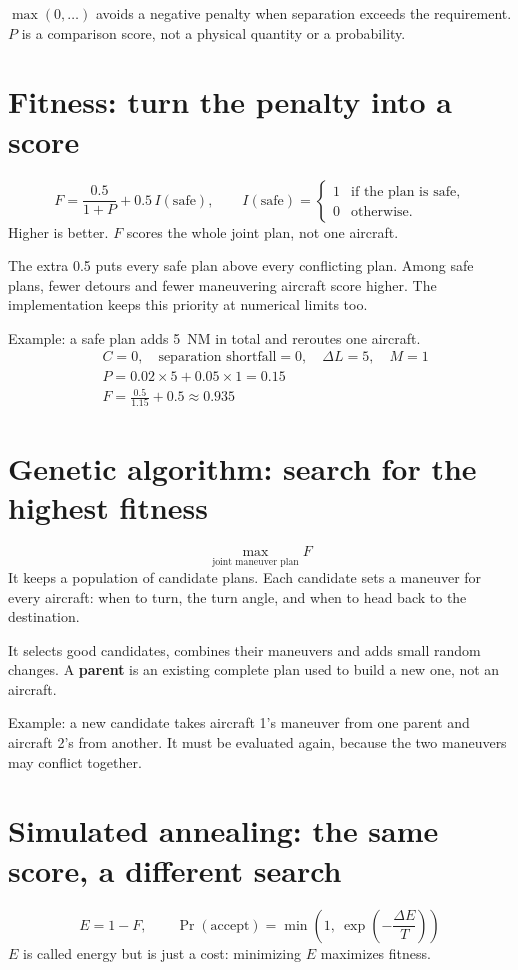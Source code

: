 \documentclass[10pt,a4paper]{article}
\begin{document}
$\max(0,\dots)$ avoids a negative penalty when separation exceeds the requirement. $P$ is a comparison score, not a physical quantity or a probability.

\section{Fitness: turn the penalty into a score}
\[
F = \frac{0.5}{1+P} + 0.5\,I(\text{safe}),
\qquad
I(\text{safe}) = \begin{cases}1 & \text{if the plan is safe,}\\ 0 & \text{otherwise.}\end{cases}
\]
Higher is better. $F$ scores the whole joint plan, not one aircraft.

The extra 0.5 puts every safe plan above every conflicting plan. Among safe plans, fewer detours and fewer maneuvering aircraft score higher. The implementation keeps this priority at numerical limits too.

Example: a safe plan adds 5~NM in total and reroutes one aircraft.
\begin{align*}
&C = 0,\quad \text{separation shortfall} = 0,\quad \Delta L = 5,\quad M = 1\\
&P = 0.02\times 5 + 0.05\times 1 = 0.15\\
&F = \frac{0.5}{1.15} + 0.5 \approx 0.935
\end{align*}

\section{Genetic algorithm: search for the highest fitness}
\[
\max_{\text{joint maneuver plan}} F
\]
It keeps a population of candidate plans. Each candidate sets a maneuver for every aircraft: when to turn, the turn angle, and when to head back to the destination.

It selects good candidates, combines their maneuvers and adds small random changes. A \textbf{parent} is an existing complete plan used to build a new one, not an aircraft.

Example: a new candidate takes aircraft 1's maneuver from one parent and aircraft 2's from another. It must be evaluated again, because the two maneuvers may conflict together.

\section{Simulated annealing: the same score, a different search}
\[
E = 1-F, \qquad \Pr(\text{accept}) = \min\!\left(1,\ \exp\!\left(-\frac{\Delta E}{T}\right)\right)
\]
$E$ is called energy but is just a cost: minimizing $E$ maximizes fitness.
\end{document}
